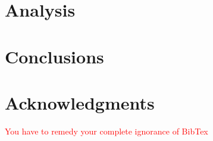 \documentclass[12pt]{article}
\begin{document}


\section{Analysis}




\section{Conclusions}


\section{Acknowledgments}

\textcolor{red}{You have to remedy your complete ignorance of BibTex}
\end{document}
